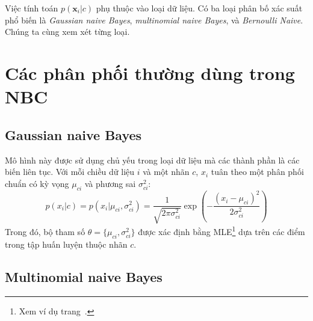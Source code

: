 
Việc tính toán $p(\mathbf{x}_i | c) $ phụ thuộc vào loại dữ liệu. Có ba loại
phân bố xác suất phổ biến là \textit{Gaussian naive Bayes},
\textit{multinomial naive Bayes}, và \textit{Bernoulli Naive}. Chúng ta cùng xem xét  từng loại.





\section{Các phân phối thường dùng trong NBC}


\subsection{Gaussian naive Bayes }
Mô hình này được sử dụng chủ yếu trong loại dữ liệu mà các thành phần là các
biến liên tục. Với mỗi chiều dữ liệu $i$ và một nhãn $c$, $x_i$ tuân theo một
phân phối chuẩn có kỳ vọng $\mu_{ci}$ và phương sai $\sigma_{ci}^2$:
\begin{equation}
\label{eqn:32_8}
p(x_i|c) = p(x_i | \mu_{ci}, \sigma_{ci}^2) =  \frac{1}{\sqrt{2\pi \sigma_{ci}^2}} \exp\left(- \frac{(x_i - \mu_{ci})^2}{2 \sigma_{ci}^2}\right)
\end{equation}
Trong đó, bộ tham số $\theta = \{\mu_{ci}, \sigma_{ci}^2\}$ được xác định bằng
MLE\footnote{Xem ví dụ trang~\pageref{sssec:gassian_mle}.} dựa trên các điểm trong tập huấn luyện thuộc nhãn $c$.


\subsection{Multinomial naive Bayes }

